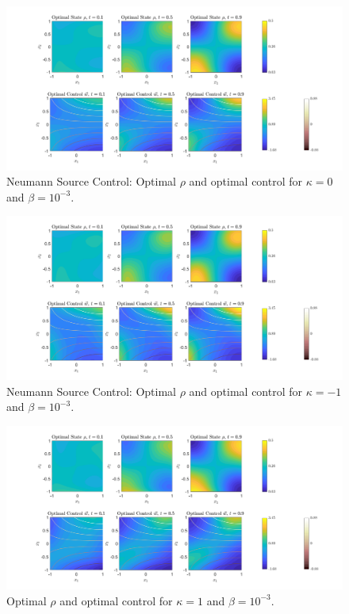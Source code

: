 \documentclass[11pt, a4paper]{article}
\theoremstyle{definition}
\begin{document}
	\begin{figure}[h]
		\centering
		\includegraphics[scale=0.35]{SCNk0.png}
		\caption{Neumann Source Control: Optimal $\rho$ and optimal control for $\kappa = 0$ and $\beta = 10^{-3}$.} 
		\label{F1a}
	\end{figure}
	\begin{figure}[h]
		\centering
		\includegraphics[scale=0.35]{SCNkn1.png}
		\caption{Neumann Source Control: Optimal $\rho$ and optimal control for $\kappa = -1$ and $\beta = 10^{-3}$.} 
		\label{F1b}
	\end{figure}
	\begin{figure}[h]
		\centering
		\includegraphics[scale=0.35]{SCNk1.png}
		\caption{Optimal $\rho$ and optimal control for $\kappa = 1$ and $\beta = 10^{-3}$.} 
		\label{F1c}
	\end{figure}
\end{document}
